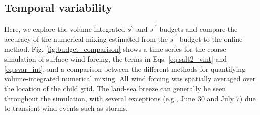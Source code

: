 \subsection{Temporal variability}

Here, we explore the volume-integrated $s^2$ and $s^{\prime^2}$ budgets and compare the accuracy of the numerical mixing estimated from the $s^{\prime^2}$ budget to the online method. Fig. \ref{fig:budget_comparison} shows a time series for the coarse simulation of surface wind forcing, the terms in Eqs. \ref{eq:salt2_vint} and \ref{eq:svar_int}, and a comparison between the different methods for quantifying volume-integrated numerical mixing. All wind forcing was spatially averaged over the location of the child grid. The land-sea breeze can generally be seen throughout the simulation, with several exceptions (e.g., June 30 and July 7) due to transient wind events such as storms. 

